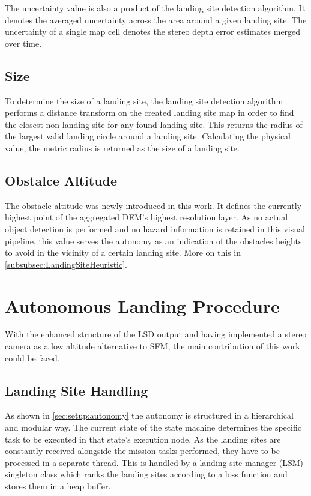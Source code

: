 The uncertainty value is also a product of the landing site detection algorithm. It denotes the averaged uncertainty across the area around a given landing site. The uncertainty of a single map cell denotes the stereo depth error estimates merged over time.

\subsection{Size}

To determine the size of a landing site, the landing site detection algorithm performs a distance transform on the created landing site map in order to find the closest non-landing site for any found landing site. This returns the radius of the largest valid landing circle around a landing site. Calculating the physical value, the metric radius is returned as the size of a landing site.

\subsection{Obstalce Altitude}

The obstacle altitude was newly introduced in this work. It defines the currently highest point of the aggregated DEM's highest resolution layer. As no actual object detection is performed and no hazard information is retained in this visual pipeline, this value serves the autonomy as an indication of the obstacles heights to avoid in the vicinity of a certain landing site. More on this in \cref{subsubsec:LandingSiteHeuristic}.



\section{Autonomous Landing Procedure}

With the enhanced structure of the LSD output and having implemented a stereo camera as a low altitude alternative to SFM, the main contribution of this work could be faced.

\subsection{Landing Site Handling}

As shown in \cref{sec:setup:autonomy} the autonomy is structured in a hierarchical and modular way. The current state of the state machine determines the specific task to be executed in that state's execution node. As the landing sites are constantly received alongside the mission tasks performed, they have to be processed in a separate thread. This is handled by a landing site manager (LSM) singleton class which ranks the landing sites according to a loss function and stores them in a heap buffer.

